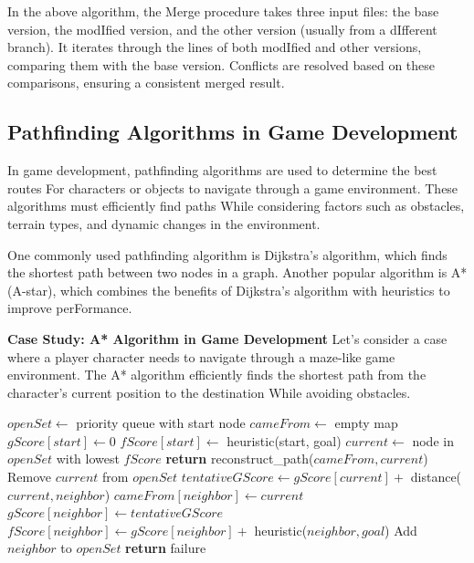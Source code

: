 \documentclass[12pt]{book} %
\begin{document}
In the above algorithm, the Merge procedure takes three input files: the base version, the modIfied version, and the other version (usually from a dIfferent branch). It iterates through the lines of both modIfied and other versions, comparing them with the base version. Conflicts are resolved based on these comparisons, ensuring a consistent merged result.

\subsection{Pathfinding Algorithms in Game Development}
In game development, pathfinding algorithms are used to determine the best routes For characters or objects to navigate through a game environment. These algorithms must efficiently find paths While considering factors such as obstacles, terrain types, and dynamic changes in the environment.

One commonly used pathfinding algorithm is Dijkstra's algorithm, which finds the shortest path between two nodes in a graph. Another popular algorithm is A* (A-star), which combines the benefits of Dijkstra's algorithm with heuristics to improve perFormance.

\textbf{Case Study: A* Algorithm in Game Development}
Let's consider a case where a player character needs to navigate through a maze-like game environment. The A* algorithm efficiently finds the shortest path from the character's current position to the destination While avoiding obstacles.

\FloatBarrier
\begin{algorithm}
\caption{A* Algorithm}
\begin{algorithmic}[1]
    \State $openSet \gets$ priority queue with start node
    \State $cameFrom \gets$ empty map
    \State $gScore[start] \gets 0$
    \State $fScore[start] \gets$ heuristic(start, goal)
        \State $current \gets$ node in $openSet$ with lowest $fScore$
            \State \textbf{return} reconstruct\_path($cameFrom, current$)
        \EndIf
        \State Remove $current$ from $openSet$
            \State $tentativeGScore \gets gScore[current] +$ distance($current, neighbor$)
                \State $cameFrom[neighbor] \gets current$
                \State $gScore[neighbor] \gets tentativeGScore$
                \State $fScore[neighbor] \gets gScore[neighbor] +$ heuristic($neighbor, goal$)
                    \State Add $neighbor$ to $openSet$
                \EndIf
            \EndIf
        \EndFor
    \EndWhile
    \State \textbf{return} failure
\EndProcedure
\end{algorithmic}
\end{algorithm}
\FloatBarrier
\end{document}
